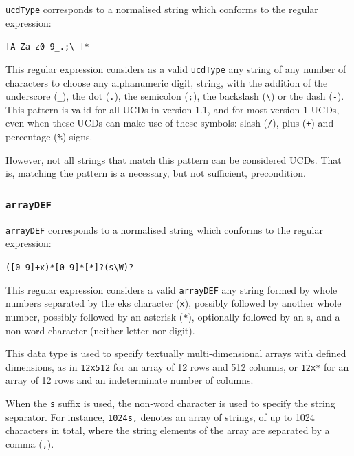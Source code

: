 \texttt{ucdType} corresponds to a normalised string which conforms
to the regular expression:

\begin{center}
	\verb![A-Za-z0-9_.;\-]*!
\end{center}

This regular expression considers as a valid \texttt{ucdType} any string
of any number of characters to choose any alphanumeric digit, string,
with the addition of the underscore (\texttt{\_}), the dot (\texttt{.}),
the semicolon (\texttt{;}), the backslash (\verb!\!) or the dash
(\texttt{-}). This pattern is valid for all UCDs in version 1.1, and for
most version 1 UCDs, even when these UCDs can make use of these symbols:
slash (\texttt{/}), plus (\texttt{+}) and percentage (\texttt{\%})
signs.

However, not all strings that match this pattern can be considered UCDs.
That is, matching the pattern is a necessary, but not sufficient,
precondition.


\subsubsection{\texttt{arrayDEF}} %
\label{ssub:arraydef}

\texttt{arrayDEF} corresponds to a normalised string which conforms to
the regular expression:

\begin{center}
	\verb!([0-9]+x)*[0-9]*[*]?(s\W)?!
\end{center}

This regular expression considers a valid \texttt{arrayDEF} any string
formed by whole numbers separated by the eks character (\texttt{x}),
possibly followed by another whole number, possibly followed by an
asterisk (\texttt{*}), optionally followed by an s, and a non-word
character (neither letter nor digit).

This data type is used to specify textually multi-dimensional arrays
with defined dimensions, as in \texttt{12x512} for an array of 12 rows
and 512 columns, or \texttt{12x*} for an array of 12 rows and an
indeterminate number of columns.

When the \texttt{s} suffix is used, the non-word character is used to
specify the string separator. For instance, \texttt{1024s,} denotes an
array of strings, of up to 1024 characters in total, where the string
elements of the array are separated by a comma (\texttt{,}).

